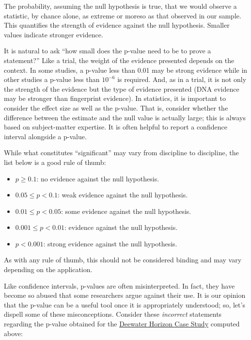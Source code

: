 \documentclass[]{book}
\providecommand{\tightlist}{%
  \setlength{\itemsep}{0pt}\setlength{\parskip}{0pt}}
\theoremstyle{definition}
\theoremstyle{definition}
\theoremstyle{definition}
\theoremstyle{remark}
\let\BeginKnitrBlock\begin \let\EndKnitrBlock\end
\begin{document}
\BeginKnitrBlock{definition}[P-Value]
\protect\hypertarget{def:defn-pvalue}{}{\label{def:defn-pvalue}
{} }The probability, assuming the null hypothesis
is true, that we would observe a statistic, by chance alone, as extreme
or moreso as that observed in our sample. This quantifies the strength
of evidence against the null hypothesis. Smaller values indicate
stronger evidence.
\EndKnitrBlock{definition}

It is natural to ask ``how small does the p-value need to be to prove a
statement?'' Like a trial, the weight of the evidence presented depends
on the context. In some studies, a p-value less than 0.01 may be strong
evidence while in other studies a p-value less than \(10^{-6}\) is
required. And, as in a trial, it is not only the strength of the
evidence but the type of evidence presented (DNA evidence may be
stronger than fingerprint evidence). In statistics, it is important to
consider the effect size as well as the p-value. That is, consider
whether the difference between the estimate and the null value is
actually large; this is always based on subject-matter expertise. It is
often helpful to report a confidence interval alongside a p-value.

\BeginKnitrBlock{rmdtip}
While what constitutes ``significant'' may vary from discipline to
discipline, the list below is a good rule of thumb:

\begin{itemize}
\tightlist
\item
  \(p \geq 0.1\): no evidence against the null hypothesis.
\item
  \(0.05 \leq p < 0.1\): weak evidence against the null hypothesis.
\item
  \(0.01 \leq p < 0.05\): some evidence against the null hypothesis.
\item
  \(0.001 \leq p < 0.01\): evidence against the null hypothesis.
\item
  \(p < 0.001\): strong evidence against the null hypothesis.
\end{itemize}

As with any rule of thumb, this should not be considered binding and may
vary depending on the application.
\EndKnitrBlock{rmdtip}

Like confidence intervals, p-values are often misinterpreted. In fact,
they have become so abused that some researchers argue against their
use. It is our opinion that the p-value can be a useful tool once it is
appropriately understood; so, let's dispell some of these
misconceptions. Consider these \emph{incorrect} statements regarding the
p-value obtained for the \protect\hyperlink{CaseDeepwater}{Deewater
Horizon Case Study} computed above:
\end{document}

